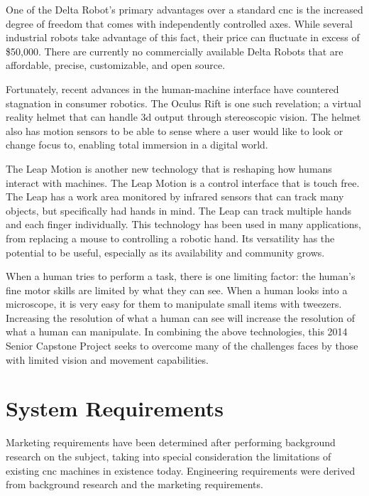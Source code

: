 \documentclass[11pt]{report}
\begin{document}
One of the Delta Robot's primary advantages over a standard \gls{cnc} is the increased degree of freedom that comes with independently controlled axes.
While several industrial robots take advantage of this fact, their price can fluctuate in excess of \$50,000.
There are currently no commercially available Delta Robots that are affordable, precise, customizable, and open source.

Fortunately, recent advances in the human-machine interface have countered stagnation in consumer robotics.
The Oculus Rift is one such revelation; a virtual reality helmet that can handle \gls{3d} output through stereoscopic vision.
The helmet also has motion sensors to be able to sense where a user would like to look or change focus to, enabling total immersion in a digital world.

The Leap Motion is another new technology that is reshaping how humans interact with machines.
The Leap Motion is a control interface that is touch free.
The Leap has a work area monitored by infrared sensors that can track many objects, but specifically had hands in mind.
The Leap can track multiple hands and each finger individually.
This technology has been used in many applications, from replacing a mouse to controlling a robotic hand.
Its versatility has the potential to be useful, especially as its availability and community grows.

When a human tries to perform a task, there is one limiting factor: the human's fine motor skills are limited by what they can see.
When a human looks into a microscope, it is very easy for them to manipulate small items with tweezers.
Increasing the resolution of what a human can see will increase the resolution of what a human can manipulate.
In combining the above technologies, this 2014 Senior Capstone Project seeks to overcome many of the challenges faces by those with limited vision and movement capabilities.

\section{System Requirements}
Marketing requirements have been determined after performing background research on the subject, taking into special consideration the limitations of existing \gls{cnc} machines in existence today. Engineering requirements were derived from background research and the marketing requirements. 
\end{document}

